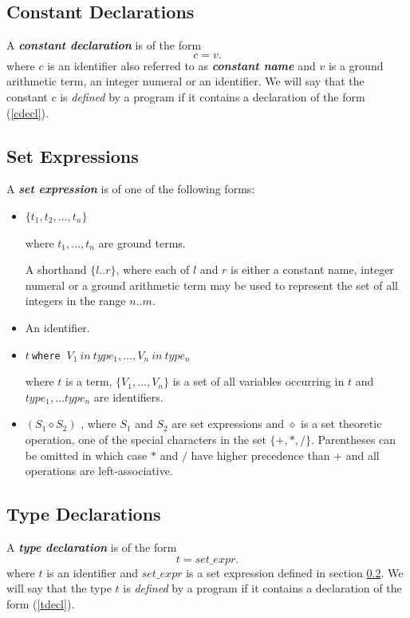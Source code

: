 \documentclass[a4paper,10pt]{article}
\begin{document}
\subsection{Constant Declarations}\label{cd}
A \textit{\textbf{constant declaration}} is of the form 
\begin{equation}\label{cdecl}
c = v.
\end{equation}
where  $c$ is an identifier also referred to as  
\textbf{\textit{constant name}}  and $v$ is a ground arithmetic term, an integer numeral  or an identifier.
We will say that the constant $c$ is \textit{defined} by a program if it contains a declaration of the form (\ref{cdecl}).
\subsection{Set Expressions}\label{sexpr}

A \textbf{\textit{set expression}}  is of one of the following forms:
\begin{itemize}
\item $\{t_1,t_2, \ldots, t_n\}$

 where $t_1,\ldots,t_n$ are ground terms. 

A shorthand $\{l..r\}$, where each of $l$ and $r$ is either a constant name, integer numeral or a ground arithmetic term may be used to represent the  set of all integers in the range $n..m$.

\item An identifier.

\item $t~$\texttt{where} $~V_1~in~type_1,\ldots, V_n~in~type_n$
 
where $t$ is a term, $\{V_1, \ldots, V_n\}$ is a set of all variables occurring in $t$ and $type_1, \ldots type_n$ are identifiers.

\item $(S_1 \diamond S_2)$ , where $S_1$ and $S_2$ are set expressions and $\diamond$ is a set theoretic operation, one of the special characters in the set $\{+,*,/\}$. Parentheses can be omitted in which case $*$ and $/$ have higher precedence than $+$ and all operations are left-associative.
\end{itemize}

\subsection{Type Declarations}
A \textit{\textbf{type declaration}} is of the form 
\begin{equation}\label{tdecl}
t = set\_expr.
\end{equation}
where $t$ is an identifier and $set\_expr$ is a set expression defined in section \ref{sexpr}.
We will say that the type $t$ is \textit{defined} by a program if it contains a declaration of the form (\ref{tdecl}). 
 
\end{document}
